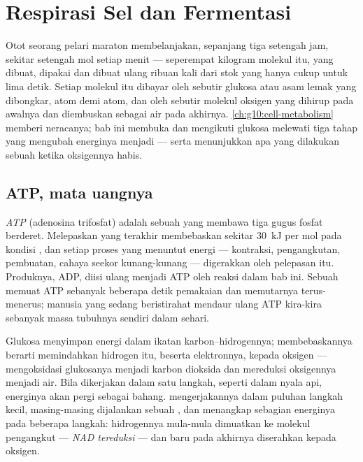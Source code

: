 \chapter{Respirasi Sel dan Fermentasi}\label{ch:g12:respiration-fermentation}

Otot seorang pelari maraton membelanjakan, sepanjang tiga setengah
jam, sekitar setengah mol  setiap menit --- seperempat kilogram
molekul itu, yang dibuat, dipakai dan dibuat ulang ribuan kali dari
stok yang hanya cukup untuk lima detik. Setiap molekul  itu dibayar
oleh sebutir glukosa atau asam lemak yang dibongkar, atom demi atom,
dan oleh sebutir molekul oksigen yang dihirup pada awalnya dan
diembuskan sebagai air pada akhirnya.
\cref{ch:g10:cell-metabolism} memberi neracanya; bab ini membuka
 dan mengikuti glukosa melewati tiga tahap yang mengubah
energinya menjadi  --- serta menunjukkan apa yang dilakukan sebuah
 ketika oksigennya habis.

\section{ATP, mata uangnya}

\begin{definition}[ATP]\label{def:g12:respiration-fermentation:atp}
\emph{ATP} (adenosina trifosfat) adalah sebuah 
yang membawa tiga gugus fosfat berderet. Melepaskan yang terakhir
membebaskan sekitar \qty{30}{kJ} per mol pada kondisi , dan setiap
proses  yang menuntut energi --- kontraksi, pengangkutan,
pembuatan, cahaya seekor kunang-kunang --- digerakkan oleh pelepasan
itu. Produknya, ADP, diisi ulang menjadi ATP oleh reaksi dalam bab
ini. Sebuah  memuat ATP sebanyak beberapa detik pemakaian dan
memutarnya terus-menerus; manusia yang sedang beristirahat mendaur
ulang ATP kira-kira sebanyak massa tubuhnya sendiri dalam sehari.
\end{definition}

\begin{proposition}\label{prop:g12:respiration-fermentation:oxidation}
Glukosa menyimpan energi dalam ikatan karbon--hidrogennya;
membebaskannya berarti memindahkan hidrogen itu, beserta elektronnya,
kepada oksigen --- mengoksidasi glukosanya menjadi karbon dioksida dan
mereduksi oksigennya menjadi air. Bila dikerjakan dalam satu langkah,
seperti dalam nyala api, energinya akan pergi sebagai bahang. 
mengerjakannya dalam puluhan langkah kecil, masing-masing dijalankan
sebuah , dan menangkap sebagian energinya pada beberapa langkah:
hidrogennya mula-mula dimuatkan ke molekul pengangkut --- \emph{NAD
tereduksi} --- dan baru pada akhirnya diserahkan kepada oksigen.
\end{proposition}
\admitted

